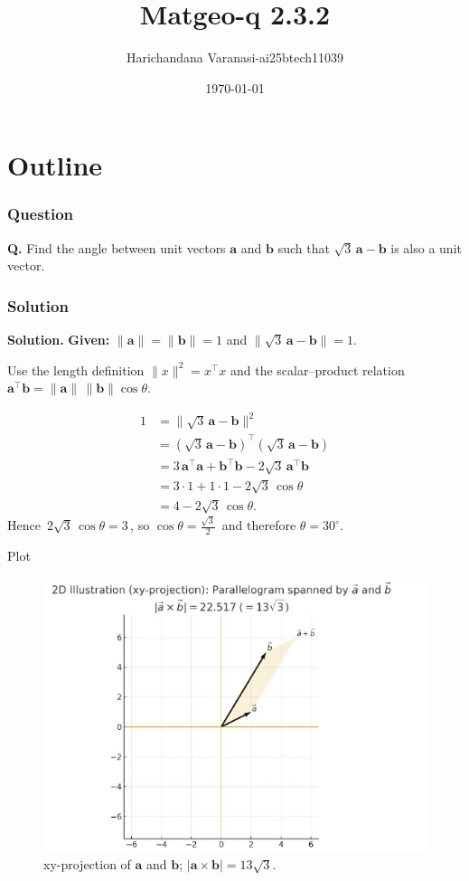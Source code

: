 \documentclass{beamer}
\title{Matgeo-q 2.3.2}
\author{Harichandana Varanasi-ai25btech11039}
\date{\today}
\theoremstyle{remark}
\let\vec\mathbf
\begin{document}
\begin{frame}
\titlepage
\end{frame}

\section*{Outline}

\begin{frame}
\frametitle{Question}
\textbf{Q.}\; Find the angle between unit vectors $\vec a$ and $\vec b$ such that $\sqrt{3}\,\vec a-\vec b$ is also a unit vector.

\end{frame}
%
\begin{frame}
\frametitle{Solution}

\textbf{Solution.}
\textbf{Given:} $\|\vec{a}\|=\|\vec{b}\|=1$ and $\bigl\|\sqrt{3}\,\vec{a}-\vec{b}\bigr\|=1$.

\medskip
Use the length definition $\|x\|^2=x^\top x$ and the scalar–product relation $\vec{a}^\top\vec{b}=\|\vec{a}\|\,\|\vec{b}\|\cos\theta$.

\medskip
\[
\begin{aligned}
1
&=\bigl\|\sqrt{3}\,\vec{a}-\vec{b}\bigr\|^{2}\\
&=(\sqrt{3}\,\vec{a}-\vec{b})^\top(\sqrt{3}\,\vec{a}-\vec{b})\\
&=3\,\vec{a}^\top\vec{a}+\vec{b}^\top\vec{b}-2\sqrt{3}\,\vec{a}^\top\vec{b}\\
&=3\cdot 1+1\cdot 1-2\sqrt{3}\,\cos\theta\\
&=4-2\sqrt{3}\,\cos\theta.
\end{aligned}
\]
Hence $\,2\sqrt{3}\,\cos\theta=3\,$, so $\displaystyle \cos\theta=\frac{\sqrt{3}}{2}\,$ and therefore $\boxed{\theta=30^\circ}$.



\end{frame}
\begin{frame}{Plot}
    \begin{figure}[h!]
\centering
\includegraphics[width=0.7\linewidth]{figs/matgeo2.3.2.jpeg}
\caption{xy-projection of $\vec a$ and $\vec b$; $|\vec a\times\vec b|=13\sqrt{3}$.}

\end{figure}
\end{frame}
\end{document}
